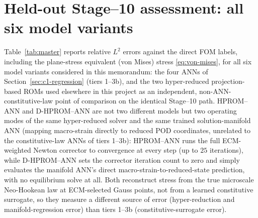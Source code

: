 \documentclass[10pt,a4paper]{article}
\begin{document}
\section{Held-out Stage--10 assessment: all six model variants}
\label{sec:results}
Table~\ref{tab:master} reports relative $L^2$ errors against the direct
FOM labels, including the plane-stress equivalent (von Mises) stress
\eqref{eq:von-mises}, for all six model variants considered in this
memorandum: the four ANNs of Section~\ref{sec:c1-regression} (tiers
1--3b), and the two hyper-reduced projection-based ROMs used elsewhere in
this project as an independent, non-ANN-constitutive-law point of
comparison on the identical Stage--10 path. HPROM--ANN and D-HPROM--ANN
are not two different models but two operating modes of the same
hyper-reduced solver and the same trained solution-manifold ANN
(mapping macro-strain directly to reduced POD coordinates, unrelated to
the constitutive-law ANNs of tiers 1--3b): HPROM--ANN runs the full
ECM-weighted Newton corrector to convergence at every step (up to $25$
iterations), while D-HPROM--ANN sets the corrector iteration count to zero
and simply evaluates the manifold ANN's direct macro-strain-to-reduced-state
prediction, with no equilibrium solve at all. Both reconstruct stress from
the true microscale Neo-Hookean law at ECM-selected Gauss points, not from
a learned constitutive surrogate, so they measure a different source of
error (hyper-reduction and manifold-regression error) than tiers 1--3b
(constitutive-surrogate error).
\end{document}
